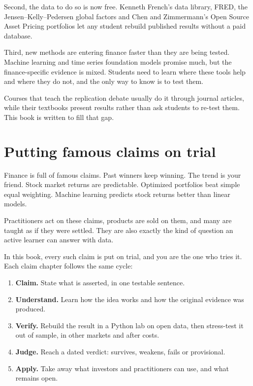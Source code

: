 Second, the data to do so is now free. Kenneth French's data library, FRED, the Jensen--Kelly--Pedersen global factors and Chen and Zimmermann's Open Source Asset Pricing portfolios let any student rebuild published results without a paid database.

Third, new methods are entering finance faster than they are being tested. Machine learning and time series foundation models promise much, but the finance-specific evidence is mixed. Students need to learn where these tools help and where they do not, and the only way to know is to test them.

Courses that teach the replication debate usually do it through journal articles, while their textbooks present results rather than ask students to re-test them. This book is written to fill that gap.

\section*{Putting famous claims on trial}

Finance is full of famous claims. Past winners keep winning. The trend is your friend. Stock market returns are predictable. Optimized portfolios beat simple equal weighting. Machine learning predicts stock returns better than linear models.

Practitioners act on these claims, products are sold on them, and many are taught as if they were settled. They are also exactly the kind of question an active learner can answer with data.

In this book, every such claim is put on trial, and you are the one who tries it. Each claim chapter follows the same cycle:

\begin{enumerate}
  \item \textbf{Claim.} State what is asserted, in one testable sentence.
  \item \textbf{Understand.} Learn how the idea works and how the original evidence was produced.
  \item \textbf{Verify.} Rebuild the result in a Python lab on open data, then stress-test it out of sample, in other markets and after costs.
  \item \textbf{Judge.} Reach a dated verdict: survives, weakens, fails or provisional.
  \item \textbf{Apply.} Take away what investors and practitioners can use, and what remains open.
\end{enumerate}

